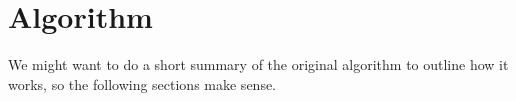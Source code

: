 \newpage
\section{Algorithm}
We might want to do a short summary of the original algorithm to outline how it works, so the following sections make sense.
